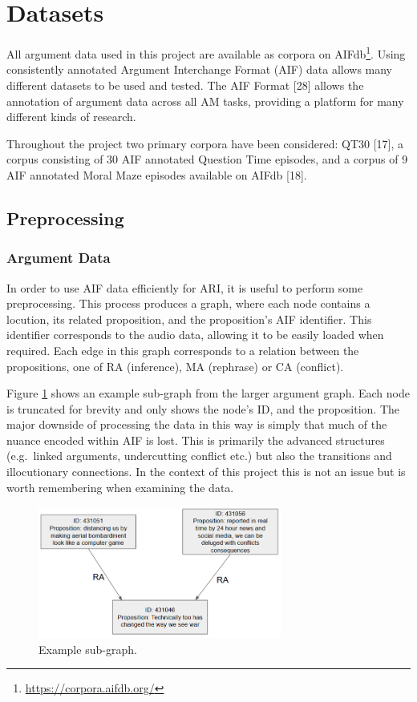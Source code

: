 \documentclass[twocolumn]{article}
\begin{document}
\section{Datasets}\label{sec:datasets}

All argument data used in this project are available as corpora on
AIFdb\footnote{\url{https://corpora.aifdb.org/}}. Using consistently annotated
Argument Interchange Format (AIF) data allows many different datasets to
be used and tested. The AIF Format {[}28{]} allows the annotation of
argument data across all AM tasks, providing a platform for many
different kinds of research.

Throughout the project two primary corpora have been considered: QT30
{[}17{]}, a corpus consisting of 30 AIF annotated Question Time
episodes, and a corpus of 9 AIF annotated Moral Maze episodes available
on AIFdb {[}18{]}.

\subsection{Preprocessing}\label{preprocessing}

\subsubsection{Argument Data}\label{sec:arg-data}

In order to use AIF data efficiently for ARI, it is useful to perform
some preprocessing. This process produces a graph, where each node
contains a locution, its related proposition, and the proposition's AIF
identifier. This identifier corresponds to the audio data, allowing it
to be easily loaded when required. Each edge in this graph corresponds
to a relation between the propositions, one of RA (inference), MA
(rephrase) or CA (conflict).

Figure \ref{fig:arg-map} shows an example sub-graph from the larger
argument graph. Each node is truncated for brevity and only shows the
node's ID, and the proposition. The major downside of processing the
data in this way is simply that much of the nuance encoded within AIF is
lost. This is primarily the advanced structures (e.g.~linked arguments,
undercutting conflict etc.) but also the transitions and illocutionary
connections. In the context of this project this is not an issue but is
worth remembering when examining the data.

\begin{figure}[h]
\centering
\includegraphics[width=8cm]{argument-map}
\caption{Example sub-graph. \label{fig:arg-map}}
\end{figure}
\end{document}
